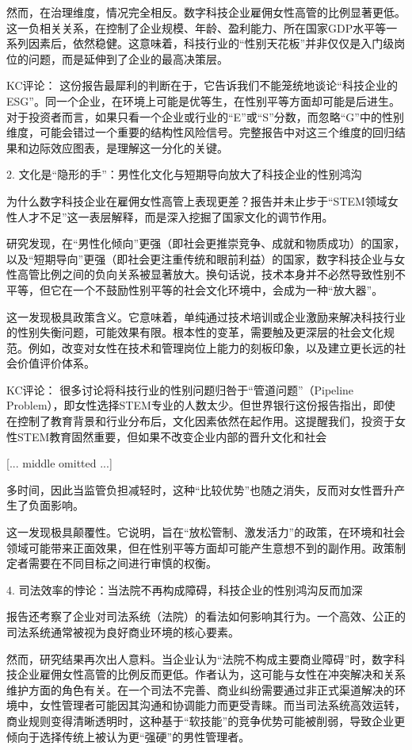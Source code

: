 \documentclass[11pt]{ctexart}
\begin{document}
然而，在治理维度，情况完全相反。数字科技企业雇佣女性高管的比例显著更低。这一负相关关系，在控制了企业规模、年龄、盈利能力、所在国家GDP水平等一系列因素后，依然稳健。这意味着，科技行业的“性别天花板”并非仅仅是入门级岗位的问题，而是延伸到了企业的最高决策层。

KC评论： 这份报告最犀利的判断在于，它告诉我们不能笼统地谈论“科技企业的ESG”。同一个企业，在环境上可能是优等生，在性别平等方面却可能是后进生。对于投资者而言，如果只看一个企业或行业的“E”或“S”分数，而忽略“G”中的性别维度，可能会错过一个重要的结构性风险信号。完整报告中对这三个维度的回归结果和边际效应图表，是理解这一分化的关键。

2. 文化是“隐形的手”：男性化文化与短期导向放大了科技企业的性别鸿沟

为什么数字科技企业在雇佣女性高管上表现更差？报告并未止步于“STEM领域女性人才不足”这一表层解释，而是深入挖掘了国家文化的调节作用。

研究发现，在“男性化倾向”更强（即社会更推崇竞争、成就和物质成功）的国家，以及“短期导向”更强（即社会更注重传统和眼前利益）的国家，数字科技企业与女性高管比例之间的负向关系被显著放大。换句话说，技术本身并不必然导致性别不平等，但它在一个不鼓励性别平等的社会文化环境中，会成为一种“放大器”。

这一发现极具政策含义。它意味着，单纯通过技术培训或企业激励来解决科技行业的性别失衡问题，可能效果有限。根本性的变革，需要触及更深层的社会文化规范。例如，改变对女性在技术和管理岗位上能力的刻板印象，以及建立更长远的社会价值评价体系。

KC评论： 很多讨论将科技行业的性别问题归咎于“管道问题”（Pipeline Problem），即女性选择STEM专业的人数太少。但世界银行这份报告指出，即使在控制了教育背景和行业分布后，文化因素依然在起作用。这提醒我们，投资于女性STEM教育固然重要，但如果不改变企业内部的晋升文化和社会

[... middle omitted ...]

多时间，因此当监管负担减轻时，这种“比较优势”也随之消失，反而对女性晋升产生了负面影响。

这一发现极具颠覆性。它说明，旨在“放松管制、激发活力”的政策，在环境和社会领域可能带来正面效果，但在性别平等方面却可能产生意想不到的副作用。政策制定者需要在不同目标之间进行审慎的权衡。

4. 司法效率的悖论：当法院不再构成障碍，科技企业的性别鸿沟反而加深

报告还考察了企业对司法系统（法院）的看法如何影响其行为。一个高效、公正的司法系统通常被视为良好商业环境的核心要素。

然而，研究结果再次出人意料。当企业认为“法院不构成主要商业障碍”时，数字科技企业雇佣女性高管的比例反而更低。作者认为，这可能与女性在冲突解决和关系维护方面的角色有关。在一个司法不完善、商业纠纷需要通过非正式渠道解决的环境中，女性管理者可能因其沟通和协调能力而更受青睐。而当司法系统高效运转，商业规则变得清晰透明时，这种基于“软技能”的竞争优势可能被削弱，导致企业更倾向于选择传统上被认为更“强硬”的男性管理者。
\end{document}
